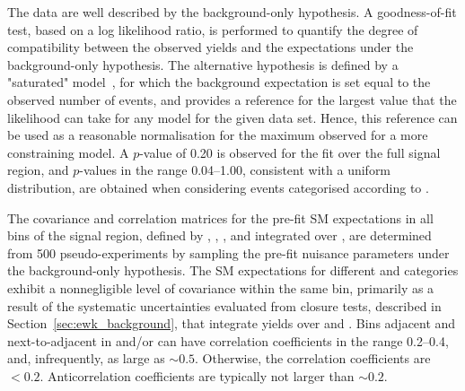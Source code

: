The data are well described by the background-only hypothesis. 
A goodness-of-fit test, based on a log likelihood ratio, is performed
to quantify the degree of compatibility between the observed yields
and the expectations under the background-only hypothesis. The
alternative hypothesis is defined by a "saturated"
model~\cite{sat-llk}, for which the background expectation is set
equal to the observed number of events, and provides a reference for
the largest value that the likelihood can take for any model for the
given data set. Hence, this reference can be used as a reasonable
normalisation for the maximum observed for a more constraining
model. A $p$-value of 0.20 is observed for the fit over the full
signal region, and $p$-values in the range 0.04--1.00, consistent with
a uniform distribution, are obtained when considering events
categorised according to \njet.

The covariance and correlation matrices for the pre-fit SM
expectations in all bins of the signal region, defined by \njet, \nb,
\scalht, and integrated over \HTmiss, are determined from 500
pseudo-experiments by sampling the pre-fit nuisance parameters under
the background-only hypothesis. The SM expectations for different
\njet and \nb categories exhibit a nonnegligible level of covariance
within the same \scalht bin, primarily as a result of the systematic
uncertainties evaluated from closure tests, described in
Section~\ref{sec:ewk_background}, that integrate yields over \njet and
\nb. Bins adjacent and next-to-adjacent in \njet and/or \nb can have
correlation coefficients in the range 0.2--0.4, and, infrequently, as
large as $\sim 0.5$. Otherwise, the correlation coefficients are
$<0.2$. Anticorrelation coefficients are typically not larger than
$\sim 0.2$.

